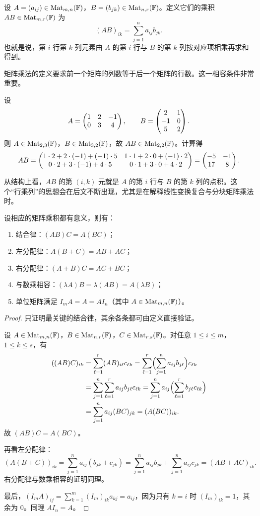 \begin{definition}
设 $A=(a_{ij})\in\mathrm{Mat}_{m,n}(\mathbb{F})$，$B=(b_{jk})\in\mathrm{Mat}_{n,r}(\mathbb{F})$。定义它们的乘积 $AB\in\mathrm{Mat}_{m,r}(\mathbb{F})$ 为
\[
(AB)_{ik}=\sum_{j=1}^n a_{ij}b_{jk}.
\]
也就是说，第 $i$ 行第 $k$ 列元素由 $A$ 的第 $i$ 行与 $B$ 的第 $k$ 列按对应项相乘再求和得到。
\end{definition}

矩阵乘法的定义要求前一个矩阵的列数等于后一个矩阵的行数。这一相容条件非常重要。

\begin{example}[行乘列]
设
\[
A=\begin{pmatrix} 1&2&-1\\0&3&4 \end{pmatrix},\qquad B=\begin{pmatrix} 2&1\\-1&0\\5&2 \end{pmatrix}.
\]
则 $A\in\mathrm{Mat}_{2,3}(\mathbb{F})$，$B\in\mathrm{Mat}_{3,2}(\mathbb{F})$，故 $AB\in\mathrm{Mat}_{2,2}(\mathbb{F})$。计算得
\[
AB=\begin{pmatrix} 
1\cdot2+2\cdot(-1)+(-1)\cdot5 & 1\cdot1+2\cdot0+(-1)\cdot2\\
0\cdot2+3\cdot(-1)+4\cdot5 & 0\cdot1+3\cdot0+4\cdot2
 \end{pmatrix}
=\begin{pmatrix} -5&-1\\17&8 \end{pmatrix}.
\]
\end{example}

从结构上看，$AB$ 的第 $(i,k)$ 元就是 $A$ 的第 $i$ 行与 $B$ 的第 $k$ 列的点积。这个“行乘列”的思想会在后文不断出现，尤其是在解释线性变换复合与分块矩阵乘法时。

\begin{proposition}[矩阵乘法的基本性质]
设相应的矩阵乘积都有意义，则有：
\begin{enumerate}[label=(\arabic*)]
  \item 结合律：$(AB)C=A(BC)$；
  \item 左分配律：$A(B+C)=AB+AC$；
  \item 右分配律：$(A+B)C=AC+BC$；
  \item 与数乘相容：$(\lambda A)B=\lambda(AB)=A(\lambda B)$；
  \item 单位矩阵满足 $I_mA=A=AI_n$（其中 $A\in\mathrm{Mat}_{m,n}(\mathbb{F})$）。
\end{enumerate}
\end{proposition}

\begin{proof}
只证明最关键的结合律，其余各条都可由定义直接验证。

设 $A\in\mathrm{Mat}_{m,n}(\mathbb{F})$，$B\in\mathrm{Mat}_{n,r}(\mathbb{F})$，$C\in\mathrm{Mat}_{r,s}(\mathbb{F})$。对任意 $1\le i\le m$，$1\le k\le s$，有
\begin{align*}
((AB)C)_{ik}
&=\sum_{\ell=1}^r (AB)_{i\ell}c_{\ell k}
 =\sum_{\ell=1}^r\Bigl(\sum_{j=1}^n a_{ij}b_{j\ell}\Bigr)c_{\ell k}\\
&=\sum_{j=1}^n\sum_{\ell=1}^r a_{ij}b_{j\ell}c_{\ell k}
 =\sum_{j=1}^n a_{ij}\Bigl(\sum_{\ell=1}^r b_{j\ell}c_{\ell k}\Bigr)\\
&=\sum_{j=1}^n a_{ij}(BC)_{jk}
 =(A(BC))_{ik}.
\end{align*}
故 $(AB)C=A(BC)$。

再看左分配律：
\[
(A(B+C))_{ik}=\sum_{j=1}^n a_{ij}(b_{jk}+c_{jk})=\sum_{j=1}^n a_{ij}b_{jk}+\sum_{j=1}^n a_{ij}c_{jk}=(AB+AC)_{ik}.
\]
右分配律与数乘相容的证明同理。

最后，$(I_mA)_{ij}=\sum_{k=1}^m (I_m)_{ik}a_{kj}=a_{ij}$，因为只有 $k=i$ 时 $(I_m)_{ik}=1$，其余为 $0$。同理 $AI_n=A$。
\end{proof}

